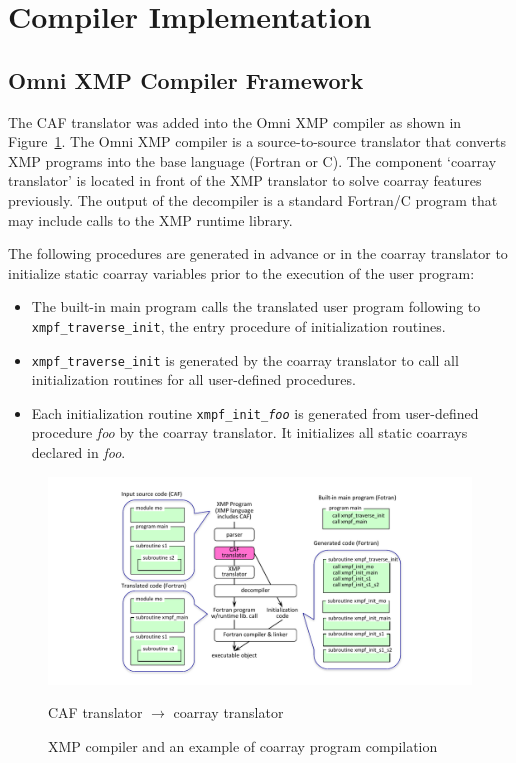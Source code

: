 \section{Compiler Implementation}\label{sec:compiler}



\subsection{Omni XMP Compiler Framework}

The CAF translator was added into the Omni XMP compiler as shown in Figure~\ref{fig:translator}.
The Omni XMP compiler is a source-to-source translator that converts XMP programs 
into the base language (Fortran or C).  The component `coarray translator' is 
located in front of the XMP translator to solve coarray features previously. 
The output of the decompiler is a standard Fortran/C program that may include 
calls to the XMP runtime library.

The following procedures are generated in advance or in the coarray translator
to initialize static coarray variables prior to the execution of the user program:
\begin{itemize}
\item
The built-in main program calls the translated user program following to 
{\tt xmpf\_traverse\_init}, the entry procedure of initialization routines.
\item
{\tt xmpf\_traverse\_init} is generated by the coarray translator to call 
all initialization routines for all user-defined procedures.
\item
Each initialization routine {\tt xmpf\_init\_{\it foo}} is generated from 
user-defined procedure {\it foo} by the coarray translator. 
It initializes all static coarrays declared in {\it foo}.
\end{itemize}

\begin{figure}[tbh]
 \begin{center}
  \includegraphics[trim=30mm 0mm 20mm 7mm, scale=1.0]{figs/translator-tmp.pdf}
  \caption{XMP compiler and an example of coarray program compilation}
  \label{fig:translator}
  CAF translator $\rightarrow$ coarray translator
 \end{center}
\end{figure}


